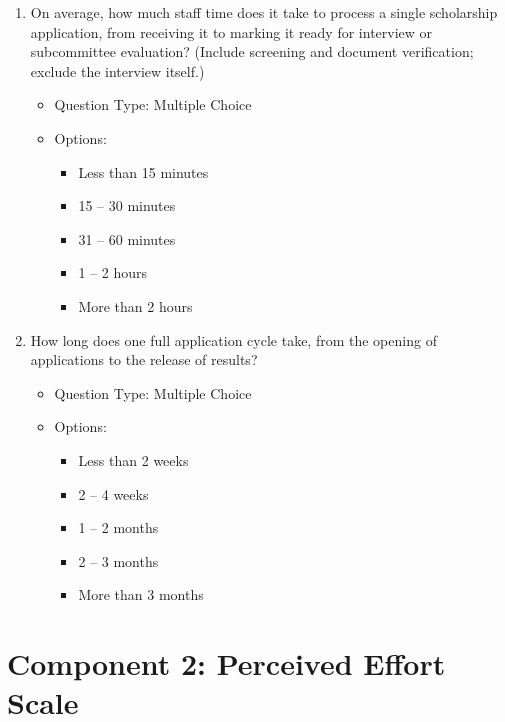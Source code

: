 \begin{enumerate}[resume=q, label={Question \arabic*:}, leftmargin=*, align=left]
  \item On average, how much staff time does it take to process a single scholarship application, from receiving it to marking it ready for interview or subcommittee evaluation? (Include screening and document verification; exclude the interview itself.)
  \begin{itemize}[leftmargin=*]
    \item Question Type: Multiple Choice
    \item Options:
    \begin{itemize}[leftmargin=*]
      \item Less than 15 minutes
      \item 15 -- 30 minutes
      \item 31 -- 60 minutes
      \item 1 -- 2 hours
      \item More than 2 hours
    \end{itemize}
  \end{itemize}
  \item How long does one full application cycle take, from the opening of applications to the release of results?
  \begin{itemize}[leftmargin=*]
    \item Question Type: Multiple Choice
    \item Options:
    \begin{itemize}[leftmargin=*]
      \item Less than 2 weeks
      \item 2 -- 4 weeks
      \item 1 -- 2 months
      \item 2 -- 3 months
      \item More than 3 months
    \end{itemize}
  \end{itemize}
\end{enumerate}

\section{Component 2: Perceived Effort Scale}

